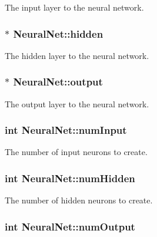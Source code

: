The input layer to the neural network. \hypertarget{classNeuralNet_b0c566728137bb3bb4c3328005dcb33b}{
\subsubsection{$\ast$ {\bf NeuralNet::hidden}}}
\label{classNeuralNet_b0c566728137bb3bb4c3328005dcb33b}


The hidden layer to the neural network. \hypertarget{classNeuralNet_97e58ab98eff78a898e9bb68ebc5be11}{
\subsubsection{$\ast$ {\bf NeuralNet::output}}}
\label{classNeuralNet_97e58ab98eff78a898e9bb68ebc5be11}


The output layer to the neural network. \hypertarget{classNeuralNet_d46f938b28b505ef25f9d0a3a256ba78}{
\subsubsection{\setlength{\rightskip}{0pt plus 5cm}int {\bf NeuralNet::numInput}}}
\label{classNeuralNet_d46f938b28b505ef25f9d0a3a256ba78}


The number of input neurons to create. \hypertarget{classNeuralNet_62cfa0d0238baf0239429fbefd63042c}{
\subsubsection{\setlength{\rightskip}{0pt plus 5cm}int {\bf NeuralNet::numHidden}}}
\label{classNeuralNet_62cfa0d0238baf0239429fbefd63042c}


The number of hidden neurons to create. \hypertarget{classNeuralNet_c20e9fd588f7be05e8d658a5b673affe}{
\subsubsection{\setlength{\rightskip}{0pt plus 5cm}int {\bf NeuralNet::numOutput}}}
\label{classNeuralNet_c20e9fd588f7be05e8d658a5b673affe}


